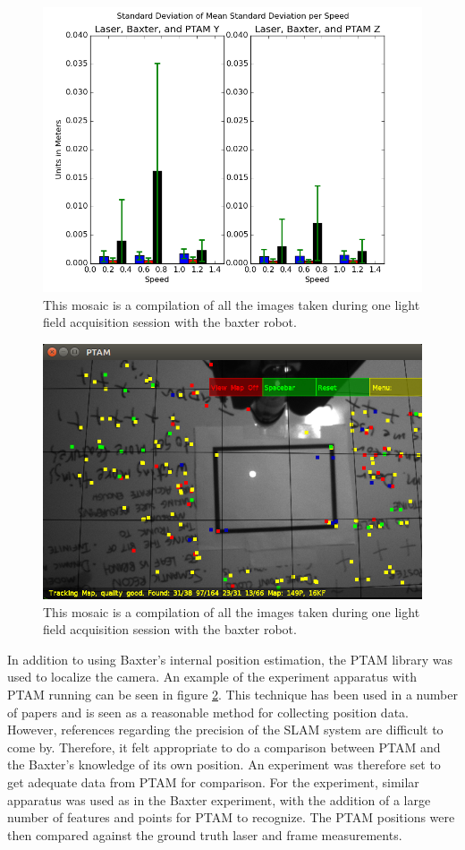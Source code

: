 \documentclass[12pt]{report}
\begin{document}
\begin{figure}[!ht]
	\centering
	\includegraphics[scale=0.55]{bax_and_ptam_std_dev.png}
	\caption{This mosaic is a compilation of all the images taken during one light field acquisition session with the baxter robot.}
	\label{fig:bax_ptam_std_dev}
\end{figure}
\begin{figure}[!ht]
	\centering
	\includegraphics[scale=0.55]{experiment_image.png}
	\caption{This mosaic is a compilation of all the images taken during one light field acquisition session with the baxter robot.}
	\label{fig:experiment_image}
\end{figure}
In addition to using Baxter's internal position estimation, the PTAM library was used to localize the camera. An example of the experiment apparatus with PTAM running can be seen in figure \ref{fig:experiment_image}. This technique has been used in a number of papers and is seen as a reasonable method for collecting position data. However, references regarding the precision of the SLAM system are difficult to come by. Therefore, it felt appropriate to do a comparison between PTAM and the Baxter's knowledge of its own position. An experiment was therefore set to get adequate data from PTAM for comparison. For the experiment, similar apparatus was used as in the Baxter experiment, with the addition of a large number of features and points for PTAM to recognize. The PTAM positions were then compared against the ground truth laser and frame measurements. 
\end{document}
